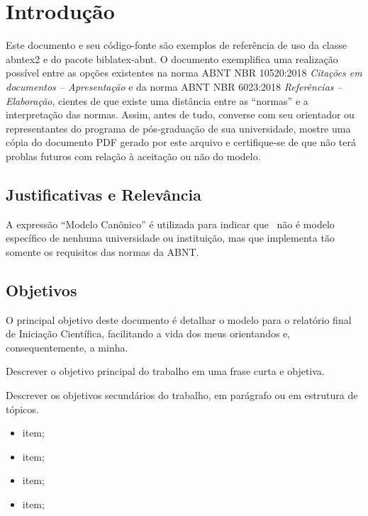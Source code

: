 \documentclass[
	12pt,				%
	oneside, %
	a4paper,			%
	english,			%
	brazil				%
	]{abntex2}
\begin{document}
\chapter[Introdução]{Introdução}
Este documento e seu código-fonte são exemplos de referência de uso da classe \textsf{abntex2} e do pacote \textsf{biblatex-abnt}. O documento exemplifica uma realização possível entre as opções existentes na norma ABNT NBR 10520:2018 \emph{Citações em documentos -- Apresentação} e da norma ABNT NBR 6023:2018 \emph{Referências -- Elaboração}, cientes de que existe uma distância entre as ``normas'' e a interpretação das normas. Assim, antes de tudo, converse com seu orientador ou representantes do programa de pós-graduação de sua universidade, mostre uma cópia do documento PDF gerado por este arquivo e certifique-se de que não terá problas futuros com relação à aceitação ou não do modelo.

\section{Justificativas e Relevância}

A expressão ``Modelo Canônico'' é utilizada para indicar que \abnTeX\ não é modelo específico de nenhuma universidade ou instituição, mas que implementa tão somente os requisitos das normas da ABNT.

\section{Objetivos}

O principal objetivo deste documento é detalhar o modelo para o relatório final de Iniciação Científica, facilitando a vida dos meus orientandos e, consequentemente, a minha.

Descrever o objetivo principal do trabalho em uma frase curta e objetiva.

Descrever os objetivos secundários do trabalho, em parágrafo ou em estrutura de tópicos. %

\begin{itemize}
	\item item;
	\item item;
	\item item;
	\item item;
\end{itemize}

\end{document}
